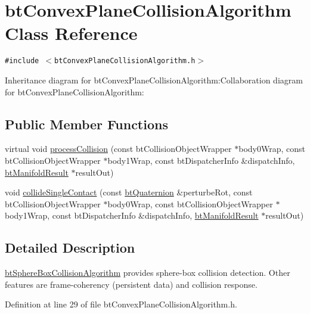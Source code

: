 \hypertarget{classbt_convex_plane_collision_algorithm}{
\section{btConvexPlaneCollisionAlgorithm Class Reference}
\label{classbt_convex_plane_collision_algorithm}
}
{\tt \#include $<$btConvexPlaneCollisionAlgorithm.h$>$}

Inheritance diagram for btConvexPlaneCollisionAlgorithm:Collaboration diagram for btConvexPlaneCollisionAlgorithm:\subsection*{Public Member Functions}
\begin{CompactItemize}
\item 
virtual void \hyperlink{classbt_convex_plane_collision_algorithm_ce95b966a346d00f7666549220f6afb8}{processCollision} (const btCollisionObjectWrapper $\ast$body0Wrap, const btCollisionObjectWrapper $\ast$body1Wrap, const btDispatcherInfo \&dispatchInfo, \hyperlink{classbt_manifold_result}{btManifoldResult} $\ast$resultOut)
\item 
void \hyperlink{classbt_convex_plane_collision_algorithm_79f8384fcdc2145be9fca0057edc8b69}{collideSingleContact} (const \hyperlink{classbt_quaternion}{btQuaternion} \&perturbeRot, const btCollisionObjectWrapper $\ast$body0Wrap, const btCollisionObjectWrapper $\ast$body1Wrap, const btDispatcherInfo \&dispatchInfo, \hyperlink{classbt_manifold_result}{btManifoldResult} $\ast$resultOut)
\end{CompactItemize}


\subsection{Detailed Description}
\hyperlink{classbt_sphere_box_collision_algorithm}{btSphereBoxCollisionAlgorithm} provides sphere-box collision detection. Other features are frame-coherency (persistent data) and collision response. 

Definition at line 29 of file btConvexPlaneCollisionAlgorithm.h.

